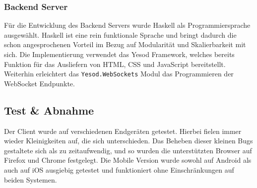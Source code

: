 \subsubsection{Backend Server}
Für die Entwicklung des Backend Servers wurde Haskell als
Programmiersprache ausgewählt. Haskell ist eine rein funktionale
Sprache und bringt dadurch die schon angesprochenen Vorteil im Bezug
auf Modularität und Skalierbarkeit mit sich. Die Implementierung
verwendet das \gls{Yesod Framework}, welches bereits Funktion für das
Ausliefern von HTML, CSS und JavaScript bereitstellt. Weiterhin erleichtert
das \texttt{Yesod.WebSockets} Modul das Programmieren der WebSocket Endpunkte.
\subsection{Test \& Abnahme}
Der Client wurde auf verschiedenen Endgeräten getestet. Hierbei fielen
immer wieder Kleinigkeiten auf, die sich unterschieden. Das Beheben
dieser kleinen Bugs gestaltete sich als zu zeitaufwendig, und so wurden
die unterstützten Browser auf Firefox und Chrome festgelegt.
Die Mobile Version wurde sowohl auf Android als auch auf iOS ausgiebig
getestet und funktioniert ohne Einschränkungen auf beiden Systemen.

